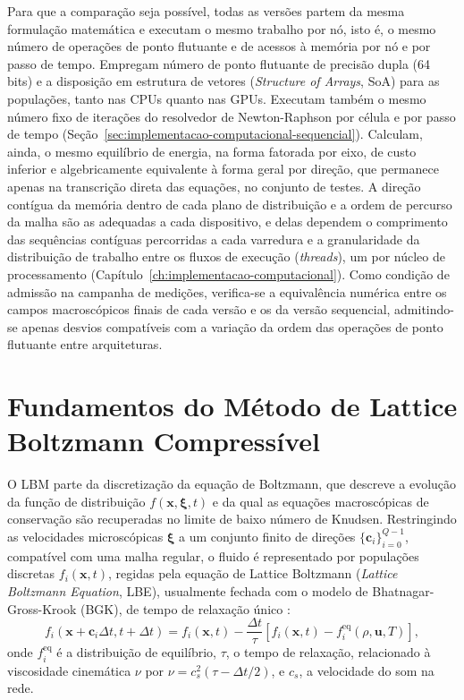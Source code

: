 Para que a comparação seja possível, todas as versões partem da mesma formulação matemática e executam o mesmo trabalho por nó, isto é, o mesmo número de operações de ponto flutuante e de acessos à memória por nó e por passo de tempo.
Empregam número de ponto flutuante de precisão dupla (64 bits) e a disposição em estrutura de vetores (\textit{Structure of Arrays}, SoA) para as populações, tanto nas CPUs quanto nas GPUs.
Executam também o mesmo número fixo de iterações do resolvedor de Newton-Raphson por célula e por passo de tempo (Seção~\ref{sec:implementacao-computacional-sequencial}).
Calculam, ainda, o mesmo equilíbrio de energia, na forma fatorada por eixo, de custo inferior e algebricamente equivalente à forma geral por direção, que permanece apenas na transcrição direta das equações, no conjunto de testes.
A direção contígua da memória dentro de cada plano de distribuição e a ordem de percurso da malha são as adequadas a cada dispositivo, e delas dependem o comprimento das sequências contíguas percorridas a cada varredura e a granularidade da distribuição de trabalho entre os fluxos de execução (\textit{threads}), um por núcleo de processamento (Capítulo~\ref{ch:implementacao-computacional}).
Como condição de admissão na campanha de medições, verifica-se a equivalência numérica entre os campos macroscópicos finais de cada versão e os da versão sequencial, admitindo-se apenas desvios compatíveis com a variação da ordem das operações de ponto flutuante entre arquiteturas.


\section{Fundamentos do Método de Lattice Boltzmann Compressível}\label{sec:fundamentos-lbm}

O LBM parte da discretização da equação de Boltzmann, que descreve a evolução da função de distribuição $f(\mathbf{x}, \boldsymbol{\xi}, t)$ e da qual as equações macroscópicas de conservação são recuperadas no limite de baixo número de Knudsen.
Restringindo as velocidades microscópicas $\boldsymbol{\xi}$ a um conjunto finito de direções $\{\mathbf{c}_i\}_{i=0}^{Q-1}$, compatível com uma malha regular, o fluido é representado por populações discretas $f_i(\mathbf{x}, t)$, regidas pela equação de Lattice Boltzmann (\textit{Lattice Boltzmann Equation}, LBE), usualmente fechada com o modelo de Bhatnagar-Gross-Krook (BGK), de tempo de relaxação único \parencite{Bhatnagar1954}:
\begin{equation}
    f_i(\mathbf{x} + \mathbf{c}_i \Delta t, t + \Delta t) = f_i(\mathbf{x}, t) - \frac{\Delta t}{\tau} \left[ f_i(\mathbf{x}, t) - f_i^{\text{eq}}(\rho, \mathbf{u}, T) \right], \label{eq:lbm-bgk}
\end{equation}
onde $f_i^{\text{eq}}$ é a distribuição de equilíbrio, $\tau$, o tempo de relaxação, relacionado à viscosidade cinemática $\nu$ por $\nu = c_s^2 (\tau - \Delta t / 2)$, e $c_s$, a velocidade do som na rede.

